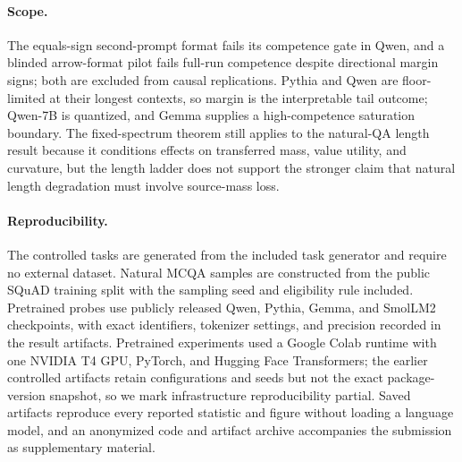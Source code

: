 \documentclass{article}
\begin{document}
\paragraph{Scope.}
The equals-sign second-prompt format fails its competence gate in Qwen, and a blinded arrow-format pilot fails
full-run competence despite directional margin signs; both are excluded from causal replications. Pythia and
Qwen are floor-limited at their longest contexts, so margin is the interpretable tail outcome; Qwen-7B is
quantized, and Gemma supplies a high-competence saturation boundary. The fixed-spectrum theorem still applies
to the natural-QA length result because it conditions effects on transferred mass, value utility, and
curvature, but the length ladder does not support the stronger claim that natural length degradation must
involve source-mass loss.

\paragraph{Reproducibility.}
The controlled tasks are generated from the included task generator and require no external dataset. Natural
MCQA samples are constructed from the public SQuAD training split \citep{rajpurkar2016squad} with the sampling
seed and eligibility rule included. Pretrained probes use publicly released Qwen, Pythia, Gemma, and SmolLM2
checkpoints, with exact identifiers, tokenizer settings, and precision recorded in the result artifacts.
Pretrained experiments used a Google Colab runtime with one NVIDIA T4 GPU, PyTorch, and Hugging Face
Transformers; the earlier controlled artifacts retain configurations and seeds but not the exact
package-version snapshot, so we mark infrastructure reproducibility partial. Saved artifacts reproduce every
reported statistic and figure without loading a language model, and an anonymized code and artifact archive
accompanies the submission as supplementary material.
\end{document}
